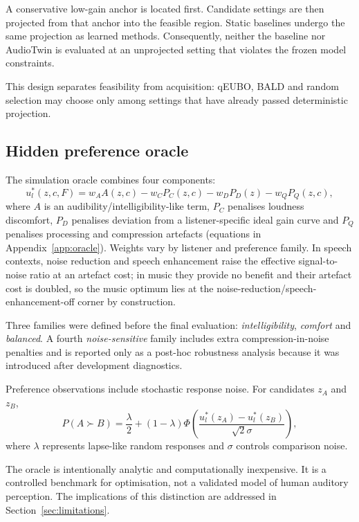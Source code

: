 \documentclass[preprint,12pt]{elsarticle}
\begin{document}
A conservative low-gain anchor is located first. Candidate settings are then projected from that anchor into the feasible region. Static baselines undergo the same projection as learned methods. Consequently, neither the baseline nor AudioTwin is evaluated at an unprojected setting that violates the frozen model constraints.

This design separates feasibility from acquisition: qEUBO, BALD and random selection may choose only among settings that have already passed deterministic projection.

\subsection{Hidden preference oracle}
\label{sec:oracle}

The simulation oracle combines four components:
\begin{equation}
 u_l^*(z,c,F)=w_A A(z,c)-w_C P_C(z,c)-w_D P_D(z)-w_Q P_Q(z,c),
 \label{eq:oracle}
\end{equation}
where $A$ is an audibility/intelligibility-like term, $P_C$ penalises loudness discomfort, $P_D$ penalises deviation from a listener-specific ideal gain curve and $P_Q$ penalises processing and compression artefacts (equations in Appendix~\ref{app:oracle}). Weights vary by listener and preference family. In speech contexts, noise reduction and speech enhancement raise the effective signal-to-noise ratio at an artefact cost; in music they provide no benefit and their artefact cost is doubled, so the music optimum lies at the noise-reduction/speech-enhancement-off corner by construction.

Three families were defined before the final evaluation: \emph{intelligibility}, \emph{comfort} and \emph{balanced}. A fourth \emph{noise-sensitive} family includes extra compression-in-noise penalties and is reported only as a post-hoc robustness analysis because it was introduced after development diagnostics.

Preference observations include stochastic response noise. For candidates $z_A$ and $z_B$,
\begin{equation}
 P(A\succ B)=\frac{\lambda}{2}+(1-\lambda)\Phi\left(\frac{u_l^*(z_A)-u_l^*(z_B)}{\sqrt{2}\sigma}\right),
 \label{eq:oracle-choice}
\end{equation}
where $\lambda$ represents lapse-like random responses and $\sigma$ controls comparison noise.

The oracle is intentionally analytic and computationally inexpensive. It is a controlled benchmark for optimisation, not a validated model of human auditory perception. The implications of this distinction are addressed in Section~\ref{sec:limitations}.
\end{document}

